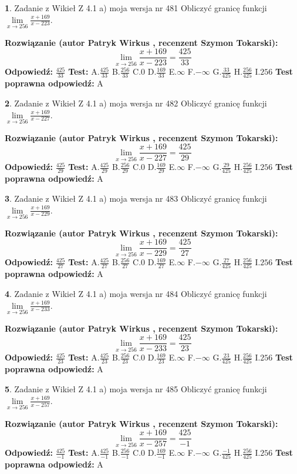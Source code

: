 \documentclass[12pt, a4paper]{article}
\theoremstyle{definition} %
\newtheorem{zad}{}
\newcommand{\zadStart}[1]{\begin{zad}#1\newline}
\newcommand{\zadStop}{\end{zad}}
\newcommand{\rozwStart}[2]{\noindent \textbf{Rozwiązanie (autor #1 , recenzent #2): }\newline}
\newcommand{\rozwStop}{\newline}
\newcommand{\odpStart}{\noindent \textbf{Odpowiedź:}\newline}
\newcommand{\odpStop}{\newline}
\newcommand{\testStart}{\noindent \textbf{Test:}\newline}
\newcommand{\testStop}{\newline}
\newcommand{\kluczStart}{\noindent \textbf{Test poprawna odpowiedź:}\newline}
\newcommand{\kluczStop}{\newline}
\begin{document}
\zadStart{Zadanie z Wikieł Z 4.1 a) moja wersja nr 481}
Obliczyć granicę funkcji $\lim\limits_{x\to256}\frac{x+169}{x-223}$.
\zadStop
\rozwStart{Patryk Wirkus}{Szymon Tokarski}
$$\lim\limits_{x\to256}\frac{x+169}{x-223} = \frac{425}{33}$$
\rozwStop
\odpStart
$\frac{425}{33}$
\odpStop
\testStart
A.$\frac{425}{33}$
B.$\frac{256}{33}$
C.$0$
D.$\frac{169}{33}$
E.$\infty$
F.$-\infty$
G.$\frac{33}{425}$
H.$\frac{256}{425}$
I.$256$
\testStop
\kluczStart
A
\kluczStop



\zadStart{Zadanie z Wikieł Z 4.1 a) moja wersja nr 482}
Obliczyć granicę funkcji $\lim\limits_{x\to256}\frac{x+169}{x-227}$.
\zadStop
\rozwStart{Patryk Wirkus}{Szymon Tokarski}
$$\lim\limits_{x\to256}\frac{x+169}{x-227} = \frac{425}{29}$$
\rozwStop
\odpStart
$\frac{425}{29}$
\odpStop
\testStart
A.$\frac{425}{29}$
B.$\frac{256}{29}$
C.$0$
D.$\frac{169}{29}$
E.$\infty$
F.$-\infty$
G.$\frac{29}{425}$
H.$\frac{256}{425}$
I.$256$
\testStop
\kluczStart
A
\kluczStop



\zadStart{Zadanie z Wikieł Z 4.1 a) moja wersja nr 483}
Obliczyć granicę funkcji $\lim\limits_{x\to256}\frac{x+169}{x-229}$.
\zadStop
\rozwStart{Patryk Wirkus}{Szymon Tokarski}
$$\lim\limits_{x\to256}\frac{x+169}{x-229} = \frac{425}{27}$$
\rozwStop
\odpStart
$\frac{425}{27}$
\odpStop
\testStart
A.$\frac{425}{27}$
B.$\frac{256}{27}$
C.$0$
D.$\frac{169}{27}$
E.$\infty$
F.$-\infty$
G.$\frac{27}{425}$
H.$\frac{256}{425}$
I.$256$
\testStop
\kluczStart
A
\kluczStop



\zadStart{Zadanie z Wikieł Z 4.1 a) moja wersja nr 484}
Obliczyć granicę funkcji $\lim\limits_{x\to256}\frac{x+169}{x-233}$.
\zadStop
\rozwStart{Patryk Wirkus}{Szymon Tokarski}
$$\lim\limits_{x\to256}\frac{x+169}{x-233} = \frac{425}{23}$$
\rozwStop
\odpStart
$\frac{425}{23}$
\odpStop
\testStart
A.$\frac{425}{23}$
B.$\frac{256}{23}$
C.$0$
D.$\frac{169}{23}$
E.$\infty$
F.$-\infty$
G.$\frac{23}{425}$
H.$\frac{256}{425}$
I.$256$
\testStop
\kluczStart
A
\kluczStop



\zadStart{Zadanie z Wikieł Z 4.1 a) moja wersja nr 485}
Obliczyć granicę funkcji $\lim\limits_{x\to256}\frac{x+169}{x-257}$.
\zadStop
\rozwStart{Patryk Wirkus}{Szymon Tokarski}
$$\lim\limits_{x\to256}\frac{x+169}{x-257} = \frac{425}{-1}$$
\rozwStop
\odpStart
$\frac{425}{-1}$
\odpStop
\testStart
A.$\frac{425}{-1}$
B.$\frac{256}{-1}$
C.$0$
D.$\frac{169}{-1}$
E.$\infty$
F.$-\infty$
G.$\frac{-1}{425}$
H.$\frac{256}{425}$
I.$256$
\testStop
\kluczStart
A
\kluczStop
\end{document}
